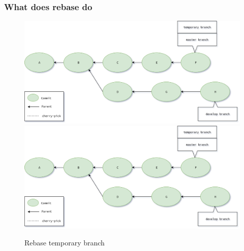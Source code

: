 \begin{frame}[fragile]
    \frametitle{What does rebase do}
    \begin{figure}
        \begin{center}
            {
                \includegraphics[width=1\textwidth,keepaspectratio]{./images/Rebase_TempBranch.png}
            }
            {
                \includegraphics[height=0.75\textheight,keepaspectratio]{./images/Rebase_TempBranch.png}
            }
            \caption{Rebase temporary branch}
        \end{center}
    \end{figure}
\end{frame}

